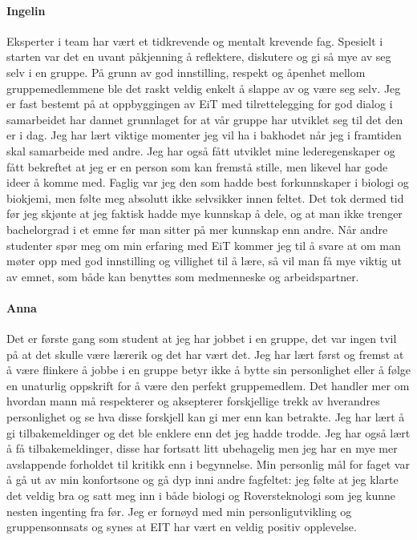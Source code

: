\paragraph{Ingelin}
Eksperter i team har vært et tidkrevende og mentalt krevende fag. 
Spesielt i starten var det en uvant påkjenning å reflektere, diskutere og gi så mye av seg selv i en gruppe. 
På grunn av god innstilling, respekt og åpenhet mellom gruppemedlemmene ble det raskt veldig enkelt å slappe av og være seg selv.
Jeg er fast bestemt på at oppbyggingen av EiT med tilrettelegging for god dialog i samarbeidet har dannet grunnlaget for at vår gruppe har utviklet seg til det den er i dag.
Jeg har lært viktige momenter jeg vil ha i bakhodet når jeg i framtiden skal samarbeide med andre.
Jeg har også fått utviklet mine lederegenskaper og fått bekreftet at jeg er en person som kan fremstå stille, men likevel har gode ideer å komme med.
Faglig var jeg den som hadde best forkunnskaper i biologi og biokjemi, men følte meg absolutt ikke selvsikker innen feltet.
Det tok dermed tid før jeg skjønte at jeg faktisk hadde mye kunnskap å dele, og at man ikke trenger bachelorgrad i et emne før man sitter på mer kunnskap enn andre.
Når andre studenter spør meg om min erfaring med EiT kommer jeg til å svare at om man møter opp med god innstilling og villighet til å lære, så vil man få mye viktig ut av emnet, som både kan benyttes som medmenneske og arbeidspartner.

\paragraph{Anna}
Det er første gang som student at jeg har jobbet i en gruppe, det var ingen tvil på at det skulle være lærerik og det har vært det.
Jeg har lært først og fremst at å være flinkere å jobbe i en gruppe betyr ikke å bytte sin personlighet eller å følge en unaturlig oppskrift for å være den perfekt gruppemedlem. 
Det handler mer om hvordan mann må respekterer og aksepterer forskjellige trekk av hverandres personlighet og se hva disse forskjell kan gi mer enn kan betrakte. 
Jeg har lært å gi tilbakemeldinger og det ble enklere enn det jeg hadde trodde. 
Jeg har også lært å få tilbakemeldinger, disse har fortsatt litt ubehagelig men jeg har
 en mye mer avslappende forholdet til kritikk enn i begynnelse. 
 Min personlig mål for faget var å gå ut av min konfortsone og gå dyp inni andre fagfeltet: jeg følte at jeg klarte det veldig bra og satt meg inn i både biologi og Roversteknologi som jeg kunne nesten ingenting fra før. 
 Jeg er fornøyd med min personligutvikling og gruppensonnsats og synes at EIT har vært en veldig positiv opplevelse. 
 
